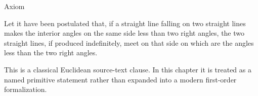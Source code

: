 \begin{lra-not-visible}
\NoLocalDependencies
\end{lra-not-visible}

\begin{axiombox}{Axiom}
\begin{axiom}
\label{ax:euclid-postulate-parallel}
Let it have been postulated that, if a straight line falling on two straight
lines makes the interior angles on the same side less than two right angles,
the two straight lines, if produced indefinitely, meet on that side on which are
the angles less than the two right angles.
\end{axiom}
\end{axiombox}
\begin{remark*}
This is a classical Euclidean source-text clause. In this chapter it is treated
as a named primitive statement rather than expanded into a modern first-order
formalization.
\end{remark*}

\begin{lra-not-visible}
\NoLocalDependencies
\end{lra-not-visible}
